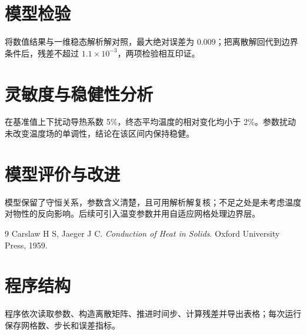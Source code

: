 \documentclass{ctexart}
\begin{document}
\section{模型检验}
将数值结果与一维稳态解析解对照，最大绝对误差为 0.009；把离散解回代到边界条件后，残差不超过 $1.1\times10^{-3}$，两项检验相互印证。

\section{灵敏度与稳健性分析}
在基准值上下扰动导热系数 5\%，终态平均温度的相对变化均小于 2\%。参数扰动未改变温度场的单调性，结论在该区间内保持稳健。

\section{模型评价与改进}
模型保留了守恒关系，参数含义清楚，且可用解析解复核；不足之处是未考虑温度对物性的反向影响。后续可引入温变参数并用自适应网格处理边界层。

\begin{thebibliography}{9}
 Carslaw H S, Jaeger J C. \emph{Conduction of Heat in Solids}. Oxford University Press, 1959.
\end{thebibliography}

\appendix
\section{程序结构}
程序依次读取参数、构造离散矩阵、推进时间步、计算残差并导出表格；每次运行保存网格数、步长和误差指标。
\end{document}
